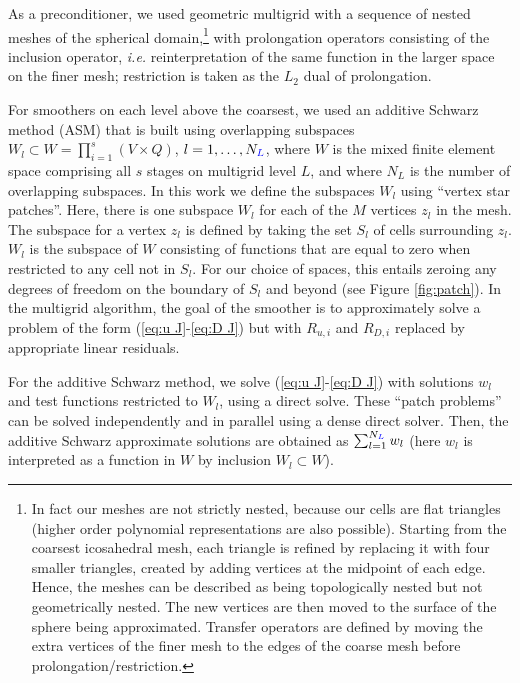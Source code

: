\documentclass[a4paper, 12pt]{article}
\newcommand{\revisedus}[1]{#1}
\newcommand{\revisedC}[1]{{\color{blue}#1}}
\begin{document}
{As a preconditioner, we used geometric multigrid with a sequence of
nested meshes of the spherical domain,\footnote{In fact our meshes are
not strictly nested, because our cells are flat triangles (higher
order polynomial representations are also possible). Starting from the
coarsest icosahedral mesh, each triangle is refined by replacing it
with four smaller triangles, created by adding vertices at the
midpoint of each edge. \revisedus{Hence, the meshes can be described as
  being topologically nested but not geometrically nested.}
The new vertices are then moved to the surface
of the sphere being approximated. Transfer operators are defined by
moving the extra vertices of the finer mesh to the edges of the coarse
mesh before prolongation/restriction.} with prolongation operators
consisting of the inclusion operator, \emph{i.e.} reinterpretation of
the same function in the larger space on the finer mesh; restriction
is taken as the $L_2$ dual of prolongation.

For smoothers on each level above the coarsest,
we used an additive Schwarz method
(ASM) that
is built using overlapping subspaces $W_l\subset W
{=\prod_{i=1}^s\left(V \times Q\right)}$, $l=1,\ldots,N_{\revisedC{L}}$,
\revisedC{where $W$ is
  the mixed finite element space comprising all $s$ stages on multigrid level $L$,
  and where $N_L$ is the number of overlapping subspaces.}
In this work we define the subspaces $W_l$ using ``vertex
star patches''.
Here, there is one subspace $W_l$ for each of the $M$
vertices $z_l$ in the mesh.
The subspace for a vertex $z_l$ is defined by
taking the set $S_l$ of cells surrounding $z_l$. $W_l$ is the subspace
of $W$ consisting of functions that are equal to zero when restricted
to any cell not in $S_l$. For our choice of spaces, this entails
zeroing any degrees of freedom on the boundary of $S_l$ and beyond
(see Figure \ref{fig:patch}). In the multigrid algorithm, the goal of
the smoother is to approximately solve a problem of the form
(\ref{eq:u J}-\ref{eq:D J}) but with $R_{u,i}$ and $R_{D,i}$ replaced
by appropriate linear residuals.

For the additive
Schwarz method, we solve (\ref{eq:u J}-\ref{eq:D J}) with solutions
$w_l$ and test functions restricted to $W_l$, using a direct
solve. These ``patch problems'' can be solved independently and in
parallel using a dense direct solver.  Then, the additive Schwarz
approximate solutions are obtained as $\sum_{l=1}^{N_{\revisedC{L}}}w_l$ (here
$w_l$ is interpreted as a function in $W$ by inclusion $W_l\subset
W$).
}
\end{document}
